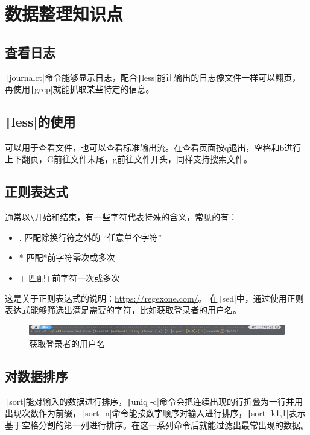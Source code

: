 \documentclass[fontset=ubuntu]{ctexart}
\begin{document}
\begin{sloppypar}
\section{数据整理知识点}
\subsection{查看日志}
\texttt|journalct|命令能够显示日志，配合\texttt|less|能让输出的日志像文件一样可以翻页，再使用\texttt|grep|就能抓取某些特定的信息。

\subsection{\texttt|less|的使用}
可以用于查看文件，也可以查看标准输出流。在查看页面按q退出，空格和b进行上下翻页，G前往文件末尾，g前往文件开头，同样支持搜索文件。

\subsection{正则表达式}
通常以\verb|\|开始和结束，有一些字符代表特殊的含义，常见的有：
\begin{itemize}
    \item . 匹配除换行符之外的 “任意单个字符”
    \item * 匹配*前字符零次或多次
    \item + 匹配+前字符一次或多次
\end{itemize}
这是关于正则表达式的说明：\url{https://regexone.com/}。
在\texttt|sed|中，通过使用正则表达式能够筛选出满足需要的字符，比如获取登录者的用户名。
\begin{figure}[htb]
    \centering
    \includegraphics[width=0.75\linewidth]{Sed.png}
    \caption{获取登录者的用户名}
    \label{fig:sed}
\end{figure}

\subsection{对数据排序}
\texttt|sort|能对输入的数据进行排序，\texttt|uniq -c|命令会把连续出现的行折叠为一行并用出现次数作为前缀，\texttt|sort -n|命令能按数字顺序对输入进行排序，\texttt|sort -k1,1|表示基于空格分割的第一列进行排序。在这一系列命令后就能过滤出最常出现的数据。

\end{sloppypar}
\end{document}
